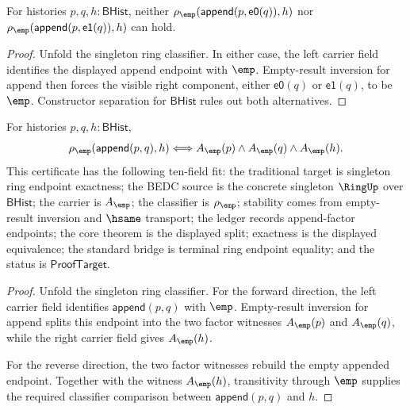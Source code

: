 \begin{theorem}
\label{thm:ring-singleton-classifier-append-visible-left-absurd}
For histories $p,q,h:\mathsf{BHist}$, neither
$\rho_{\emp}(\mathsf{append}(p,\mathsf{e0}(q)),h)$ nor
$\rho_{\emp}(\mathsf{append}(p,\mathsf{e1}(q)),h)$ can hold.
\end{theorem}
\begin{proof}
Unfold the singleton ring classifier. In either case, the left carrier field
identifies the displayed append endpoint with $\emp$. Empty-result inversion
for append then forces the visible right component, either $\mathsf{e0}(q)$ or
$\mathsf{e1}(q)$, to be $\emp$. Constructor separation for
$\mathsf{BHist}$ rules out both alternatives.
\end{proof}

\begin{theorem}
\label{thm:ring-singleton-classifier-append-split-empty}
For histories $p,q,h:\mathsf{BHist}$,
$$
\rho_{\emp}(\mathsf{append}(p,q),h)
\Longleftrightarrow
A_{\emp}(p)\land A_{\emp}(q)\land A_{\emp}(h).
$$
This certificate has the following ten-field fit: the traditional target is
singleton ring endpoint exactness; the BEDC source is the concrete singleton
$\RingUp$ over $\mathsf{BHist}$; the carrier is $A_{\emp}$; the classifier is
$\rho_{\emp}$; stability comes from empty-result inversion and $\hsame$
transport; the ledger records append-factor endpoints; the core theorem is the
displayed split; exactness is the displayed equivalence; the standard bridge is
terminal ring endpoint equality; and the status is $\mathsf{ProofTarget}$.
\end{theorem}
\begin{proof}
Unfold the singleton ring classifier. For the forward direction, the left
carrier field identifies $\mathsf{append}(p,q)$ with $\emp$. Empty-result
inversion for append splits this endpoint into the two factor witnesses
$A_{\emp}(p)$ and $A_{\emp}(q)$, while the right carrier field gives
$A_{\emp}(h)$.

For the reverse direction, the two factor witnesses rebuild the empty appended
endpoint. Together with the witness $A_{\emp}(h)$, transitivity through $\emp$
supplies the required classifier comparison between
$\mathsf{append}(p,q)$ and $h$.
\end{proof}

